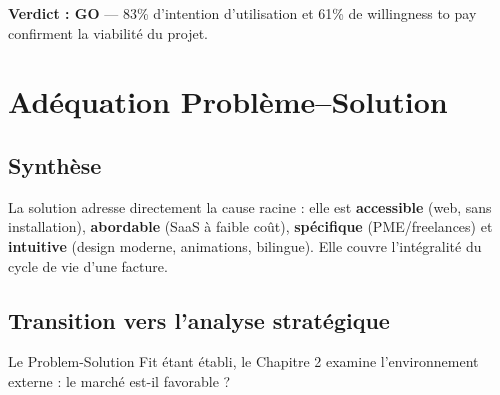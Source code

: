 \textbf{Verdict : GO} — 83\% d'intention d'utilisation et 61\% de willingness to pay confirment la viabilité du projet.

\section{Adéquation Problème–Solution}

\subsection{Synthèse}

La solution adresse directement la cause racine : elle est \textbf{accessible} (web, sans installation), \textbf{abordable} (SaaS à faible coût), \textbf{spécifique} (PME/freelances) et \textbf{intuitive} (design moderne, animations, bilingue). Elle couvre l'intégralité du cycle de vie d'une facture.

\subsection{Transition vers l'analyse stratégique}

Le Problem-Solution Fit étant établi, le Chapitre 2 examine l'environnement externe : le marché est-il favorable ?
